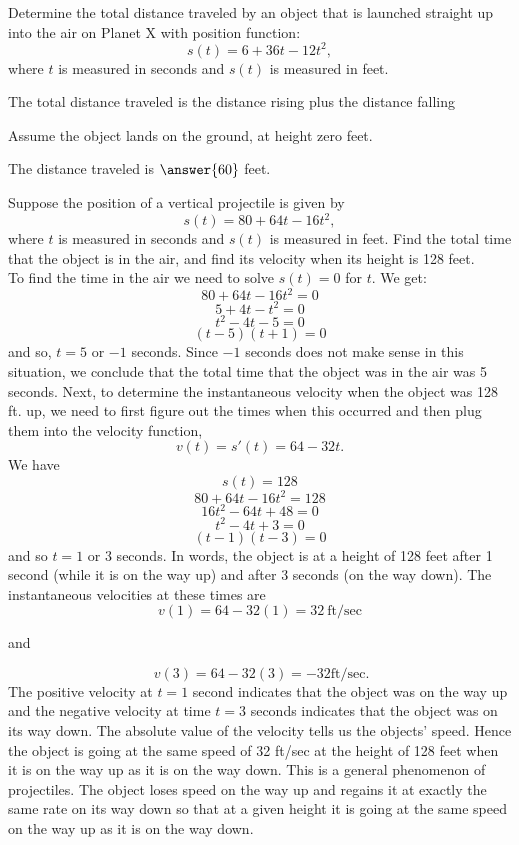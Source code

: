 \documentclass{ximera}
\begin{document}
\begin{problem}
Determine the total distance traveled by an object that is launched straight up into the air on Planet X with position function:
\[s(t) = 6 + 36t - 12t^2,\]
where $t$ is measured in seconds and $s(t)$ is measured in feet. 

\begin{hint}
The total distance traveled is the distance rising plus the distance falling
\end{hint}
\begin{hint}
Assume the object lands on the ground, at height zero feet.
\end{hint}

The distance traveled is $\answer{60}$ feet.

\end{problem}

\begin{example}
Suppose the position of a vertical projectile is given by 
\[s(t) = 80 + 64t-16t^2, \]
where $t$ is measured in seconds and $s(t)$ is measured in feet. 
Find the total time that the object is in the air, and find its velocity when its height is 128 feet.\\
 
To find the time in the air we need to solve $s(t) = 0$ for $t$. We get:
\[80 + 64t-16t^2 = 0\]
\[5 + 4t-t^2 = 0\]
\[t^2 -4t -5  = 0\]
\[(t-5)(t+1)  = 0\]
and so, $t =  5$ or $-1$ seconds. Since $-1$ seconds does not make sense in this situation, we conclude that
the total time that the object was in the air was 5 seconds.
Next, to determine the instantaneous velocity when the object was 128 ft. up, 
we need to first figure out the times when this occurred and then plug them into the velocity function, 
\[v(t) = s'(t) = 64 - 32t.\]
We have
\[s(t) = 128 \]
\[80 + 64t -16t^2 = 128\]
\[  16t^2 - 64t + 48 = 0\]
\[  t^2 - 4t + 3 = 0\]
\[  (t-1)(t-3) = 0\]
and so $t= 1$ or $3$ seconds.
In words, the object is at a height of 128 feet after 1 second (while it is on the way up) and after 3 seconds (on the way down).
The instantaneous velocities at these times are
\[v(1) = 64 - 32(1) = 32 \ \text{ft/sec}\]
\begin{center}
  and
\end{center}
\[ \ v(3) = 64 - 32(3) = -32 \text{ft/sec.}\]
The positive velocity at $t= 1$ second indicates that the object was on the way up and the negative velocity 
at time $t=3$ seconds indicates 
that the object was on its way down.  The absolute value of the velocity tells us the objects' speed. 
Hence the object is going at the same speed of 32 ft/sec at the height of 128 feet when it is on the way up as it 
is on the way down.
This is a general phenomenon of projectiles. The object loses speed on the way up and 
regains it at exactly the same rate on its way down so that at a given height it is going at the same 
speed on the way up as it is on the way down.
\end{example}
\end{document}
